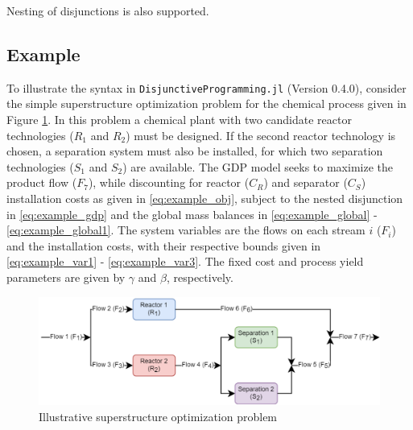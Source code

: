 \documentclass{juliacon}
\begin{document}
\vskip 6pt
Nesting of disjunctions is also supported.

\subsection{Example}
To illustrate the syntax in \verb|DisjunctiveProgramming.jl| (Version 0.4.0), consider the simple superstructure optimization problem for the chemical process given in Figure \ref{fig:superstruct_opt_diagram}. In this problem a chemical plant with two candidate reactor technologies ($R_1$ and $R_2$) must be designed. If the second reactor technology is chosen, a separation system must also be installed, for which two separation technologies ($S_1$ and $S_2$) are available. The GDP model seeks to maximize the product flow ($F_7$), while discounting for reactor ($C_R$) and separator ($C_S$) installation costs as given in \eqref{eq:example_obj}, subject to the nested disjunction in \eqref{eq:example_gdp} and the global mass balances in \eqref{eq:example_global}
- \eqref{eq:example_global1}. The system variables are the flows on each stream $i$ ($F_i$) and the installation costs, with their respective bounds given in \eqref{eq:example_var1} - \eqref{eq:example_var3}. The fixed cost and process yield parameters are given by $\gamma$ and $\beta$, respectively.

\begin{figure}
    \centering
    \includegraphics[scale=0.4]{superstructure_pfd.png}
    \caption{Illustrative superstructure optimization problem}
    \label{fig:superstruct_opt_diagram}
\end{figure}
\end{document}
